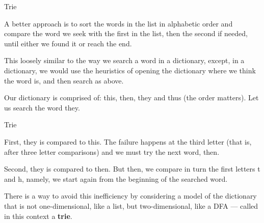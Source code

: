 \documentclass[compress,dvips,xcolor={dvipsnames},t]{beamer}
\begin{document}
%
\begin{frame}{Trie}

A better approach is to sort the words in the list in alphabetic order
and compare the word we seek with the first in the list, then the
second if needed, until either we found it or reach the end.

\bigskip

This loosely similar to the way we search a word in a dictionary,
except, in a dictionary, we would use the heuristics of opening the
dictionary where we think the word is, and then search as above.

\bigskip

Our dictionary is comprised of: \textsf{this}, \textsf{then},
\textsf{they} and \textsf{thus} (the order matters). Let us search the
word \textsf{they}.

\end{frame}

%
\begin{frame}{Trie}

First, \textsf{they} is compared to \textsf{this}. The failure happens
at the third letter (that is, after three letter comparisons) and we
must try the next word, \textsf{then}.

\bigskip

Second, \textsf{they} is compared to \textsf{then}. But then, we
compare in turn the first letters \textsf{t} and \textsf{h}, namely,
we start again from the beginning of the searched word.

\bigskip

There is a way to avoid this inefficiency by considering a model of
the dictionary that is not one-dimensional, like a list, but
two-dimensional, like a DFA --- called in this context a
\textbf{trie}.

\end{frame}
\end{document}
